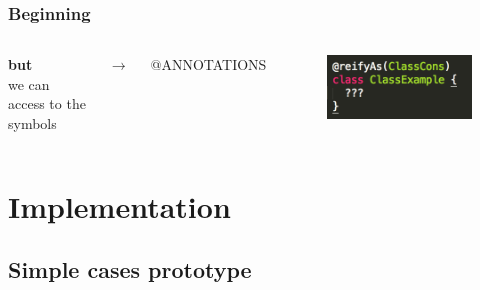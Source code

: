 \documentclass{beamer}
\begin{document}
\begin{frame}
\frametitle{Beginning}
\begin{columns}[c] %

\textbf{but}\\
we can access to the symbols 

$\rightarrow$

@ANNOTATIONS

\begin{figure}
\includegraphics[width=0.8\linewidth]{./img/annot.png}
\end{figure}

\end{columns}
\end{frame}

\section{Implementation}
\subsection{Simple cases prototype}

\newcommand{\TCR}{\textcolor{red}}
\newcommand{\TCG}{\textcolor{green}}
\newcommand{\TCB}{\textcolor{blue}}
\newcommand{\TCM}{\textcolor{brown}}
\newcommand{\TCAG}{\textcolor{applegreen}}
\end{document}

